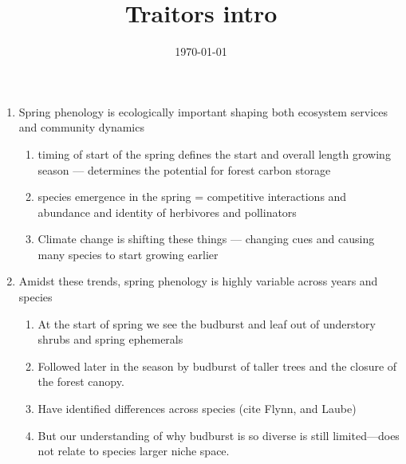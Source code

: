 \documentclass{article}
\begin{document}
\title{Traitors intro}
\date{\today}

\maketitle 

\begin{enumerate}

\item Spring phenology is ecologically important shaping both ecosystem services and community dynamics %
\begin{enumerate}
\item timing of start of the spring defines the start and overall length growing season --- determines the potential for forest carbon storage
\item species emergence in the spring = competitive interactions and abundance and identity of herbivores and pollinators 
\item Climate change is shifting these things --- changing cues and causing many species to start growing earlier
\end{enumerate}

\item Amidst these trends, spring phenology is highly variable across years and species %
\begin{enumerate}
\item At the start of spring we see the budburst and leaf out of understory shrubs and spring ephemerals
\item Followed later in the season by budburst of taller trees and the closure of the forest canopy.
\item Have identified differences across species (cite Flynn, and Laube)
\item But our understanding of why budburst is so diverse is still limited---does not relate to species larger niche space.
\end{enumerate} 


\end{enumerate}
\end{document}
